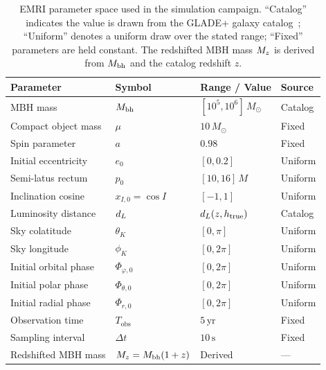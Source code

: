 \begin{table}[t]
  \caption{EMRI parameter space used in the simulation campaign.
  ``Catalog'' indicates the value is drawn from the GLADE+ galaxy
  catalog~\cite{Dalya:2021ewn}; ``Uniform'' denotes a uniform draw
  over the stated range; ``Fixed'' parameters are held constant.
  The redshifted MBH mass $M_z$ is derived from $M_\mathrm{bh}$ and the
  catalog redshift $z$.}
  \label{tab:emri_parameters}
  \centering
  \begin{tabular}{l l l l}
    \hline\hline
    Parameter & Symbol & Range / Value & Source \\
    \hline
    MBH mass & $M_\mathrm{bh}$ &
      $[10^5, 10^6]\,M_\odot$ & Catalog \\
    Compact object mass & $\mu$ &
      $10\,M_\odot$ & Fixed \\
    Spin parameter & $a$ &
      $0.98$ & Fixed \\
    Initial eccentricity & $e_0$ &
      $[0, 0.2]$ & Uniform \\
    Semi-latus rectum & $p_0$ &
      $[10, 16]\,M$ & Uniform \\
    Inclination cosine & $x_{I,0} = \cos I$ &
      $[-1, 1]$ & Uniform \\
    Luminosity distance & $d_L$ &
      $d_L(z, h_\mathrm{true})$ & Catalog \\
    Sky colatitude & $\theta_K$ &
      $[0, \pi]$ & Uniform \\
    Sky longitude & $\phi_K$ &
      $[0, 2\pi]$ & Uniform \\
    Initial orbital phase & $\Phi_{\varphi,0}$ &
      $[0, 2\pi]$ & Uniform \\
    Initial polar phase & $\Phi_{\theta,0}$ &
      $[0, 2\pi]$ & Uniform \\
    Initial radial phase & $\Phi_{r,0}$ &
      $[0, 2\pi]$ & Uniform \\
    Observation time & $T_\mathrm{obs}$ &
      $5\,\mathrm{yr}$ & Fixed \\
    Sampling interval & $\Delta t$ &
      $10\,\mathrm{s}$ & Fixed \\
    Redshifted MBH mass & $M_z = M_\mathrm{bh}(1+z)$ &
      Derived & --- \\
    \hline\hline
  \end{tabular}
\end{table}
